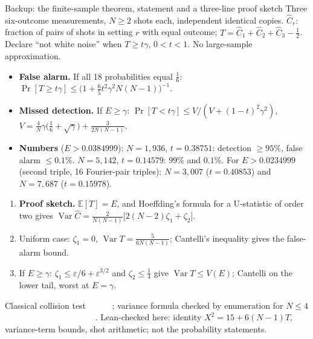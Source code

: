 \documentclass[aspectratio=169,11pt,t]{beamer}
\newcommand{\tg}[2]{{\setlength{\fboxsep}{1.2pt}\colorbox{#1}{\textcolor{white}{\sffamily\bfseries\footnotesize\,#2\,}}}}
\newcommand{\Tproved}{\tg{cProved}{proved}}
\newcommand{\Tcomp}{\tg{cCert}{certified / computed}}
\newcommand{\Tcited}{\tg{cCited}{cited}}
\begin{document}
\begin{frame}{Backup: the finite-sample theorem, statement and a three-line proof sketch}
\footnotesize
Three six-outcome measurements, $N\ge2$ shots each, independent identical copies. $\widehat C_r$: fraction of pairs of shots in setting $r$ with equal outcome; $T=\widehat C_1+\widehat C_2+\widehat C_3-\tfrac12$. Declare ``not white noise'' when $T\ge t\gamma$, $0<t<1$. No large-sample approximation. \Tproved
\begin{itemize}\footnotesize\setlength\itemsep{2pt}
\item \textbf{False alarm.} If all 18 probabilities equal $\tfrac16$: $\Pr[T\ge t\gamma]\le\bigl(1+\tfrac65t^2\gamma^2N(N-1)\bigr)^{-1}$.
\item \textbf{Missed detection.} If $E\ge\gamma$: $\Pr[T<t\gamma]\le V/(V+(1-t)^2\gamma^2)$, $V=\tfrac4N\gamma\bigl(\tfrac16+\sqrt\gamma\bigr)+\tfrac3{2N(N-1)}$.
\item \textbf{Numbers} ($E>0.0384999$): $N=1{,}936$, $t=0.38751$: detection $\ge95\%$, false alarm $\le0.1\%$. $N=5{,}142$, $t=0.14579$: $99\%$ and $0.1\%$. For $E>0.0234999$ (second triple, 16 Fourier-pair triples): $N=3{,}007$ ($t=0.40853$) and $N=7{,}687$ ($t=0.15978$).
\end{itemize}
\begin{enumerate}\footnotesize\setlength\itemsep{1pt}
\item \textbf{Proof sketch.} $\mathbb E[T]=E$, and Hoeffding's formula for a U-statistic of order two gives $\operatorname{Var}\widehat C=\tfrac2{N(N-1)}\bigl[2(N-2)\zeta_1+\zeta_2\bigr]$.
\item Uniform case: $\zeta_1=0$, $\operatorname{Var}T=\tfrac5{6N(N-1)}$; Cantelli's inequality gives the false-alarm bound.
\item If $E\ge\gamma$: $\zeta_1\le\varepsilon/6+\varepsilon^{3/2}$ and $\zeta_2\le\tfrac14$ give $\operatorname{Var}T\le V(E)$; Cantelli on the lower tail, worst at $E=\gamma$.
\end{enumerate}\vspace{-2pt}
\scriptsize Classical collision test \Tcited; variance formula checked by enumeration for $N\le4$ \Tcomp. Lean-checked here: identity $X^2=15+6(N-1)T$, variance-term bounds, shot arithmetic; not the probability statements.
\end{frame}
\end{document}
